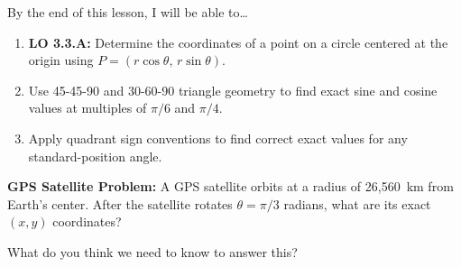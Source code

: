 \documentclass[10pt]{article}
\begin{document}
\namedateperiod

\vspace{0.1in}

\begin{objectivebox}
By the end of this lesson, I will be able to\ldots
\begin{enumerate}[itemsep=3pt]
  \item \textbf{LO 3.3.A:} Determine the coordinates of a point on a circle centered at the origin using $P = (r\cos\theta,\, r\sin\theta)$.
  \item Use 45-45-90 and 30-60-90 triangle geometry to find exact sine and cosine values at multiples of $\pi/6$ and $\pi/4$.
  \item Apply quadrant sign conventions to find correct exact values for any standard-position angle.
\end{enumerate}
\end{objectivebox}

\vspace{0.08in}

\begin{vocabbox}
\end{vocabbox}

\vspace{0.08in}

\begin{hookbox}
\textbf{GPS Satellite Problem:} A GPS satellite orbits at a radius of 26{,}560~km from Earth's center.
After the satellite rotates $\theta = \pi/3$ radians, what are its exact $(x, y)$ coordinates?

\smallskip
What do you think we need to know to answer this?

\smallskip
{}
\end{hookbox}

\vspace{0.08in}
\end{document}
